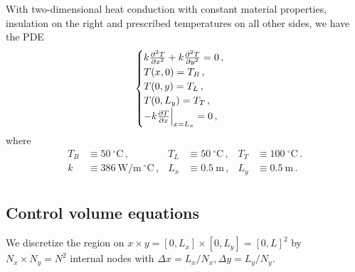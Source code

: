 \documentclass{article}
\begin{document}
With two-dimensional heat conduction with constant material properties, insulation on the right and prescribed temperatures on all other sides, we have the PDE
\begin{equation}
	\begin{cases}
		k \pdv{^2T}{x^2} + k \pdv{^2T}{y^2} = 0\,,\\
		T(x, 0) = T_B\,,\\
		T(0, y) = T_L\,,\\
		T(0, L_y) = T_T\,,\\
		-k \pdv{T}{x} \Big|_{x = L_x} = 0\,,
	\end{cases}
\end{equation}
where
\begin{align*}
	T_B & \equiv 50~^\circ\text{C}\,, & T_L & \equiv 50~^\circ\text{C}\,, & T_T & \equiv 100~^\circ\text{C}\,.\\
	k & \equiv 386~\text{W/m}~^\circ\text{C}\,, & L_x & \equiv 0.5~\text{m}\,, & L_y & \equiv 0.5~\text{m}\,.\\
\end{align*}

\subsection*{Control volume equations}

We discretize the region on $x \times y = [0, L_x] \times [0, L_y] = [0,L]^2$ by $N_x \times N_y = N^2$ internal nodes with $\Delta x = L_x / N_x, \Delta y =  L_y / N_y$.
\end{document}
